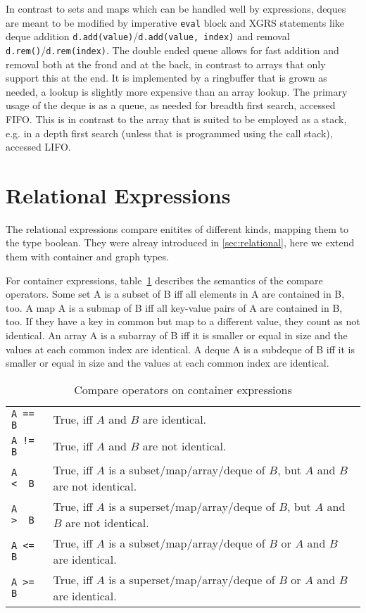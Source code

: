 \begin{note}
In contrast to sets and maps which can be handled well by expressions, deques are meant to be modified by imperative \texttt{eval} block and XGRS statements like deque addition \texttt{d.add(value)}/\texttt{d.add(value, index)} and removal \texttt{d.rem()}/\texttt{d.rem(index)}.
The double ended queue allows for fast addition and removal both at the frond and at the back, in contrast to arrays that only support this at the end.
It is implemented by a ringbuffer that is grown as needed, a lookup is slightly more expensive than an array lookup.
The primary usage of the deque is as a queue, as needed for breadth first search, accessed FIFO.
This is in contrast to the array that is suited to be employed as a stack, e.g. in a depth first search (unless that is programmed using the call stack), accessed LIFO.
\end{note}


\section{Relational Expressions}\label{sec:relationalcontainer}

The relational expressions compare enitites of different kinds, mapping them to the type boolean.
They were alreay introduced in \ref{sec:relational}, here we extend them with container and graph types.

For container expressions, table~\ref{compandsetmap} describes the semantics of the compare operators.
Some set A is a subset of B iff all elements in A are contained in B, too.
A map A is a submap of B iff all key-value pairs of A are contained in B, too. If they have a key in common but map to a different value, they count as not identical.
An array A is a subarray of B iff it is smaller or equal in size and the values at each common index are identical.
A deque A is a subdeque of B iff it is smaller or equal in size and the values at each common index are identical.
\begin{table}[htbp]
  \centering
  \begin{tabularx}{\linewidth}{|l|X|} \hline
    \texttt{A == B} & True, iff $A$ and $B$ are identical. \\
    \texttt{A != B} & True, iff $A$ and $B$ are not identical. \\
    \texttt{A <\ \ B} & True, iff $A$ is a subset/map/array/deque of $B$, but $A$ and $B$ are not identical. \\
    \texttt{A >\ \ B} & True, iff $A$ is a superset/map/array/deque of $B$, but $A$ and $B$ are not identical. \\
    \texttt{A <= B} & True, iff $A$ is a subset/map/array/deque of $B$ or $A$ and $B$ are identical. \\
    \texttt{A >= B} & True, iff $A$ is a superset/map/array/deque of $B$ or $A$ and $B$ are identical. \\ \hline
  \end{tabularx}
  \caption{Compare operators on container expressions}
  \label{compandsetmap}
\end{table}

